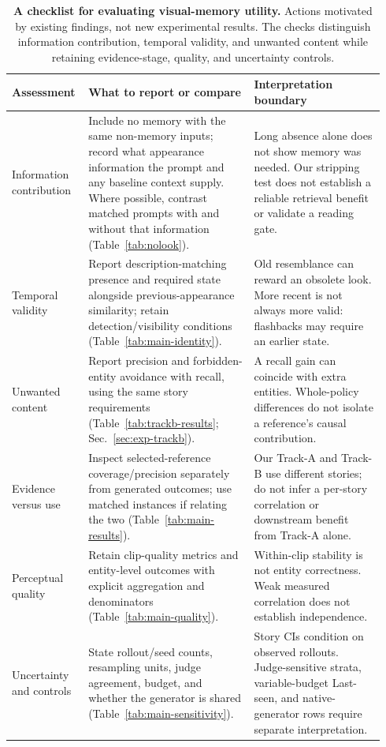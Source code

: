 \begin{table}[t]
\centering
\caption{\textbf{A checklist for evaluating visual-memory utility.} Actions motivated by existing findings, not new experimental results. The checks distinguish information contribution, temporal validity, and unwanted content while retaining evidence-stage, quality, and uncertainty controls.}
\label{tab:reader-checklist}
\footnotesize
\setlength{\tabcolsep}{3pt}
\begin{tabular}{@{}>{\raggedright\arraybackslash}p{0.17\linewidth}
                >{\raggedright\arraybackslash}p{0.43\linewidth}
                >{\raggedright\arraybackslash}p{0.34\linewidth}@{}}
\toprule
Assessment & What to report or compare & Interpretation boundary \\
\midrule
Information contribution & Include no memory with the same non-memory inputs; record what appearance information the prompt and any baseline context supply. Where possible, contrast matched prompts with and without that information (Table~\ref{tab:nolook}). & Long absence alone does not show memory was needed. Our stripping test does not establish a reliable retrieval benefit or validate a reading gate. \\
Temporal validity & Report description-matching presence and required state alongside previous-appearance similarity; retain detection/visibility conditions (Table~\ref{tab:main-identity}). & Old resemblance can reward an obsolete look. More recent is not always more valid: flashbacks may require an earlier state. \\
Unwanted content & Report precision and forbidden-entity avoidance with recall, using the same story requirements (Table~\ref{tab:trackb-results}; Sec.~\ref{sec:exp-trackb}). & A recall gain can coincide with extra entities. Whole-policy differences do not isolate a reference's causal contribution. \\
Evidence versus use & Inspect selected-reference coverage/precision separately from generated outcomes; use matched instances if relating the two (Table~\ref{tab:main-results}). & Our Track-A and Track-B use different stories; do not infer a per-story correlation or downstream benefit from Track-A alone. \\
Perceptual quality & Retain clip-quality metrics and entity-level outcomes with explicit aggregation and denominators (Table~\ref{tab:main-quality}). & Within-clip stability is not entity correctness. Weak measured correlation does not establish independence. \\
Uncertainty and controls & State rollout/seed counts, resampling units, judge agreement, budget, and whether the generator is shared (Table~\ref{tab:main-sensitivity}). & Story CIs condition on observed rollouts. Judge-sensitive strata, variable-budget Last-seen, and native-generator rows require separate interpretation. \\
\bottomrule
\end{tabular}
\end{table}
